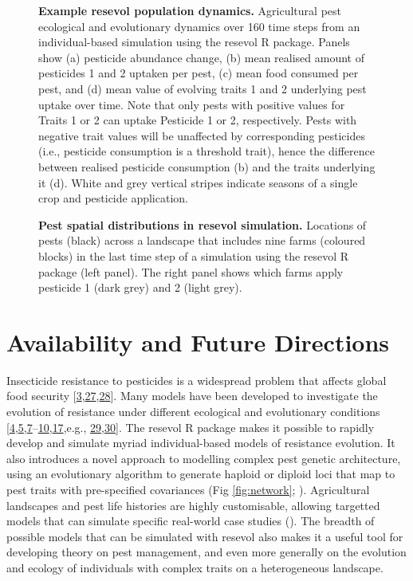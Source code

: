 \documentclass[10pt,letterpaper]{article}
\begin{document}
\begin{figure}[!h]
\caption{{\bf Example resevol population dynamics.}
Agricultural pest ecological and evolutionary dynamics over 160 time steps from an individual-based simulation using the resevol R package. Panels show (a) pesticide abundance change, (b) mean realised amount of pesticides 1 and 2 uptaken per pest, (c) mean food consumed per pest, and (d) mean value of evolving traits 1 and 2 underlying pest uptake over time. Note that only pests with positive values for Traits 1 or 2 can uptake Pesticide 1 or 2, respectively. Pests with negative trait values will be unaffected by corresponding pesticides (i.e., pesticide consumption is a threshold trait), hence the difference between realised pesticide consumption (b) and the traits underlying it (d). White and grey vertical stripes indicate seasons of a single crop and pesticide application.}
\label{fig:overtime}
\end{figure}

\begin{figure}[!h]
\caption{{\bf Pest spatial distributions in resevol simulation.}
Locations of pests (black) across a landscape that includes nine farms (coloured blocks) in the last time step of a simulation using the resevol R package (left panel). The right panel shows which farms apply pesticide 1 (dark grey) and 2 (light grey).}
\label{fig:landscape}
\end{figure}

\hypertarget{conclusions}{%
\section{Availability and Future Directions}\label{conclusions}}

Insecticide resistance to pesticides is a widespread problem that affects global food security {[}\protect\hyperlink{ref-Lykogianni2021}{3},\protect\hyperlink{ref-Tabashnik2014}{27},\protect\hyperlink{ref-Bradshaw2016}{28}{]}.
Many models have been developed to investigate the evolution of resistance under different ecological and evolutionary conditions {[}\protect\hyperlink{ref-Ives2002}{4},\protect\hyperlink{ref-Liang2013}{5},\protect\hyperlink{ref-Liang2018}{7}--\protect\hyperlink{ref-Saikai2021}{10},\protect\hyperlink{ref-Haridas2018}{17},e.g., \protect\hyperlink{ref-Curtis1985}{29},\protect\hyperlink{ref-Mani1985}{30}{]}.
The resevol R package makes it possible to rapidly develop and simulate myriad individual-based models of resistance evolution.
It also introduces a novel approach to modelling complex pest genetic architecture, using an evolutionary algorithm to generate haploid or diploid loci that map to pest traits with pre-specified covariances (Fig \ref{fig:network}; ).
Agricultural landscapes and pest life histories are highly customisable, allowing targetted models that can simulate specific real-world case studies ().
The breadth of possible models that can be simulated with resevol also makes it a useful tool for developing theory on pest management, and even more generally on the evolution and ecology of individuals with complex traits on a heterogeneous landscape.
\end{document}
